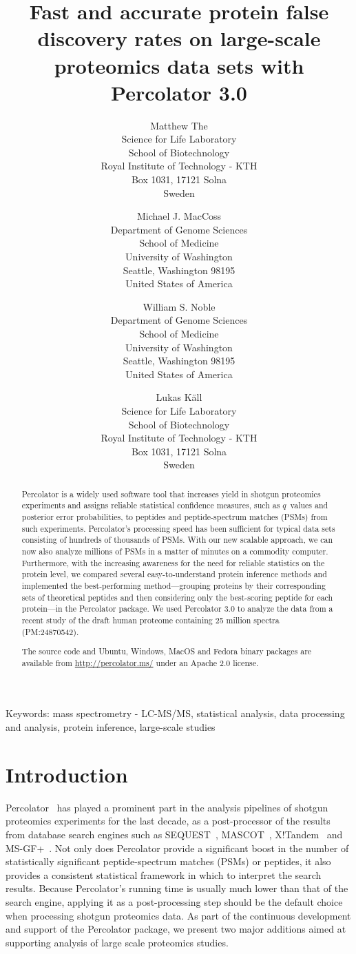 \documentclass{article}
\title{Fast and accurate protein false discovery rates on large-scale
proteomics data sets with Percolator 3.0}
\author{Matthew The\\
Science for Life Laboratory\\
School of Biotechnology\\
Royal Institute of Technology - KTH\\
Box 1031, 17121 Solna\\ Sweden
\and 
Michael J. MacCoss\\
Department of Genome Sciences\\
School of Medicine\\
University of Washington\\
Seattle, Washington 98195\\
United States of America
\and 
William S. Noble\\
Department of Genome Sciences\\
School of Medicine\\
University of Washington\\
Seattle, Washington 98195\\
United States of America
\and
Lukas K\"{a}ll\\
Science for Life Laboratory\\
School of Biotechnology\\
Royal Institute of Technology - KTH\\ 
Box 1031, 17121 Solna\\ Sweden}
\begin{document}
\maketitle

\doublespacing

Keywords: mass spectrometry - LC-MS/MS, statistical analysis, 
data processing and analysis, protein inference, large-scale studies


\newpage

\begin{abstract} 

Percolator is a widely used software tool that increases yield in
shotgun proteomics experiments and assigns reliable statistical
confidence measures, such as $q$~values and posterior error
probabilities, to peptides and peptide-spectrum matches (PSMs) from
such experiments. Percolator's processing speed has been sufficient
for typical data sets consisting of hundreds of thousands of
PSMs. With our new scalable approach, we can now also analyze millions
of PSMs in a matter of minutes on a commodity computer.  Furthermore,
with the increasing awareness for the need for reliable statistics on
the protein level, we compared several easy-to-understand protein
inference methods and implemented the best-performing
method---grouping proteins by their corresponding sets of theoretical
peptides and then considering only the best-scoring peptide for each
protein---in the Percolator package. We used Percolator 3.0 to analyze
the data from a recent study of the draft human proteome containing 25
million spectra (PM:24870542).

The source code and Ubuntu, Windows, MacOS and Fedora binary packages
are available from \url{http://percolator.ms/}
under an Apache 2.0 license.
\end{abstract}

\newpage

\section*{Introduction}

Percolator~\cite{kall2007} has played a prominent part in the analysis
pipelines of shotgun proteomics experiments for the last decade, as a
post-processor of the results from database search engines such as
SEQUEST~\cite{eng1994}, MASCOT~\cite{cottrell1999},
X!Tandem~\cite{craig2004tandem} and MS-GF+~\cite{kim2008}. Not only
does Percolator provide a significant boost in the number of
statistically significant peptide-spectrum matches (PSMs) or peptides,
it also provides a consistent statistical framework in which to
interpret the search results. Because Percolator's running time is
usually much lower than that of the search engine, applying it as a
post-processing step should be the default choice when processing
shotgun proteomics data. As part of the continuous development and
support of the Percolator package, we present two major additions
aimed at supporting analysis of large scale proteomics studies.
\end{document}
